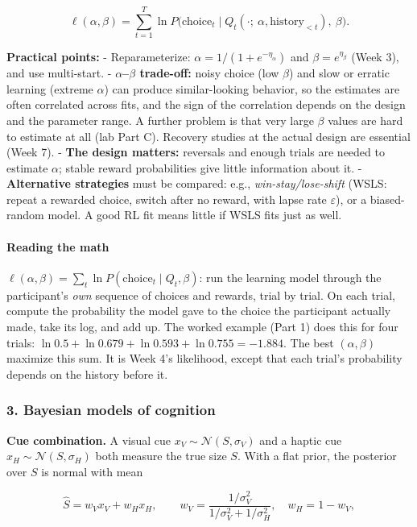\[
\ell(\alpha, \beta) = \sum_{t=1}^{T} \ln P\big(\text{choice}_t \mid Q_t(\cdot;\ \alpha, \text{history}_{<t}),\ \beta\big).
\]

\textbf{Practical points:} - Reparameterize:
\(\alpha = 1/(1 + e^{-\eta_\alpha})\) and \(\beta = e^{\eta_\beta}\)
(Week 3), and use multi-start. - \textbf{\(\alpha\)--\(\beta\)
trade-off:} noisy choice (low \(\beta\)) and slow or erratic learning
(extreme \(\alpha\)) can produce similar-looking behavior, so the
estimates are often correlated across fits, and the sign of the
correlation depends on the design and the parameter range. A further
problem is that very large \(\beta\) values are hard to estimate at all
(lab Part C). Recovery studies at the actual design are essential (Week
7). - \textbf{The design matters:} reversals and enough trials are
needed to estimate \(\alpha\); stable reward probabilities give little
information about it. - \textbf{Alternative strategies} must be
compared: e.g., \emph{win-stay/lose-shift} (WSLS: repeat a rewarded
choice, switch after no reward, with lapse rate \(\varepsilon\)), or a
biased-random model. A good RL fit means little if WSLS fits just as
well.

\paragraph{Reading the math}

\(\ell(\alpha, \beta) = \sum_t \ln P(\text{choice}_t \mid Q_t, \beta)\):
run the learning model through the participant's \emph{own} sequence of
choices and rewards, trial by trial. On each trial, compute the
probability the model gave to the choice the participant actually made,
take its log, and add up. The worked example (Part 1) does this for four
trials: \(\ln 0.5 + \ln 0.679 + \ln 0.593 + \ln 0.755 = -1.884\). The
best \((\alpha, \beta)\) maximize this sum. It is Week 4's likelihood,
except that each trial's probability depends on the history before it.

\subsubsection{3. Bayesian models of cognition}

\textbf{Cue combination.} A visual cue
\(x_V \sim \mathcal{N}(S, \sigma_V)\) and a haptic cue
\(x_H \sim \mathcal{N}(S, \sigma_H)\) both measure the true size \(S\).
With a flat prior, the posterior over \(S\) is normal with mean

\[
\hat S = w_V x_V + w_H x_H, \qquad w_V = \frac{1/\sigma_V^2}{1/\sigma_V^2 + 1/\sigma_H^2}, \quad w_H = 1 - w_V,
\]

